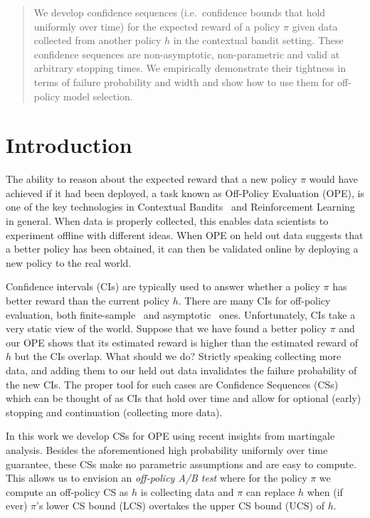 \begin{abstract}
We develop confidence sequences
(i.e.\ confidence bounds that hold uniformly over time) 
for the expected reward of a policy $\pi$ given data collected 
from another policy $h$ in the contextual bandit
setting. These confidence sequences are 
non-asymptotic, non-parametric and valid 
at arbitrary stopping times. We 
empirically demonstrate their tightness
in terms of failure probability and 
width and show how to use them for 
off-policy model selection.
\end{abstract}

\section{Introduction}
The ability to reason about the expected reward that 
a new policy $\pi$ would have achieved if it had been 
deployed, a task known as Off-Policy Evaluation (OPE),
is one of the key technologies in Contextual
Bandits~\cite{...} and Reinforcement Learning in general.
When data is properly collected, this enables data 
scientists to experiment offline with different ideas.
When OPE on held out data suggests that a better 
policy has been obtained, it can then be validated 
online by deploying a new policy to the real world.

Confidence intervals (CIs) are typically used 
to answer whether a policy $\pi$ has better 
reward than the current policy $h$. There are 
many CIs for off-policy evaluation, both 
finite-sample~\cite{HCOPE,...} and 
asymptotic~\cite{Lihong,ELFCB,...} ones.
Unfortunately, CIs take a very static view of the world.
Suppose that we have found a better policy $\pi$ 
and our OPE shows that its estimated reward is 
higher than the estimated reward of $h$ but the 
CIs overlap. What should we do? Strictly speaking
collecting more data, and adding them to our held
out data invalidates the failure probability of 
the new CIs. The proper tool for such cases
are Confidence Sequences (CSs) which can be thought
of as CIs that hold over time and allow for
optional (early) stopping and continuation 
(collecting more data).

In this work we develop CSs for OPE using 
recent insights from martingale analysis. 
Besides the aforementioned high probability
uniformly over time guarantee, these CSs make no parametric 
assumptions and are easy to compute. This
allows us to envision an \emph{off-policy A/B test}
where for the policy $\pi$ we compute 
an off-policy CS as $h$ is collecting data
and $\pi$ can replace $h$ when (if ever)
$\pi$'s lower CS bound (LCS) 
overtakes the upper CS bound (UCS) of $h$.

